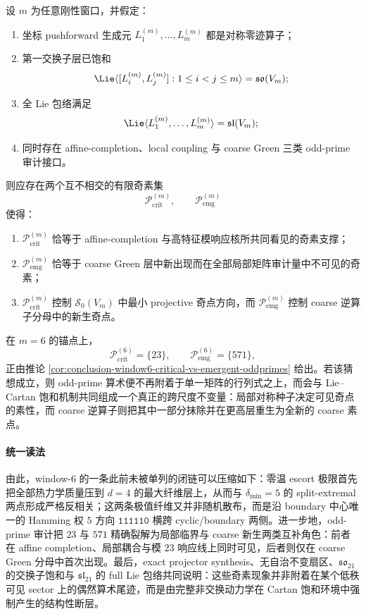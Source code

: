 \begin{conjecture}\label{conj:conclusion-window6-oddprime-translation-cartan-coupling}
设 \(m\) 为任意刚性窗口，并假定：
\begin{enumerate}
  \item 坐标 pushforward 生成元 \(L_1^{(m)},\dots,L_m^{(m)}\) 都是对称零迹算子；
  \item 第一交换子层已饱和
  \[
  \Lie\langle [L_i^{(m)},L_j^{(m)}]:1\le i<j\le m\rangle=\mathfrak{so}(V_m);
  \]
  \item 全 Lie 包络满足
  \[
  \Lie\langle L_1^{(m)},\dots,L_m^{(m)}\rangle=\mathfrak{sl}(V_m);
  \]
  \item 同时存在 affine-completion、local coupling 与 coarse Green 三类 odd-prime 审计接口。
\end{enumerate}
则应存在两个互不相交的有限奇素集
\[
\mathcal P_{\mathrm{crit}}^{(m)},
\qquad
\mathcal P_{\mathrm{emg}}^{(m)}
\]
使得：
\begin{enumerate}
  \item \(\mathcal P_{\mathrm{crit}}^{(m)}\) 恰等于 affine-completion 与高特征模响应核所共同看见的奇素支撑；
  \item \(\mathcal P_{\mathrm{emg}}^{(m)}\) 恰等于 coarse Green 层中新出现而在全部局部矩阵审计量中不可见的奇素；
  \item \(\mathcal P_{\mathrm{crit}}^{(m)}\) 控制 \(\mathcal S_0(V_m)\) 中最小 projective 奇点方向，而 \(\mathcal P_{\mathrm{emg}}^{(m)}\) 控制 coarse 逆算子分母中的新生奇点。
\end{enumerate}
在 \(m=6\) 的锚点上，
\[
\mathcal P_{\mathrm{crit}}^{(6)}=\{23\},
\qquad
\mathcal P_{\mathrm{emg}}^{(6)}=\{571\},
\]
正由推论 \ref{cor:conclusion-window6-critical-vs-emergent-oddprimes} 给出。若该猜想成立，则 odd-prime 算术便不再附着于单一矩阵的行列式之上，而会与 Lie--Cartan 饱和机制共同组成一个真正的跨尺度不变量：局部对称种子决定可见奇点的素性，而 coarse 逆算子则把其中一部分抹除并在更高层重生为全新的 coarse 素点。
\end{conjecture}

\paragraph{统一读法}
由此，window-\(6\) 的一条此前未被单列的闭链可以压缩如下：零温 escort 极限首先把全部热力学质量压到 \(d=4\) 的最大纤维层上，从而与 \(\delta_{\min}=5\) 的 split-extremal 两点形成严格反相关；这两条极值纤维又并非随机散布，而是沿 boundary 中心唯一的 Hamming 权 \(5\) 方向 \(\texttt{111110}\) 横跨 cyclic/boundary 两侧。进一步地，odd-prime 审计把 \(23\) 与 \(571\) 精确裂解为局部临界与 coarse 新生两类互补角色：前者在 affine completion、局部耦合与模 \(23\) 响应线上同时可见，后者则仅在 coarse Green 分母中首次出现。最后，exact projector synthesis、无自治不变扇区、\(\mathfrak{so}_{21}\) 的交换子饱和与 \(\mathfrak{sl}_{21}\) 的 full Lie 包络共同说明：这些奇素现象并非附着在某个低秩可见 sector 上的偶然算术尾迹，而是由完整非交换动力学在 Cartan 饱和环境中强制产生的结构性断层。

\endinput
